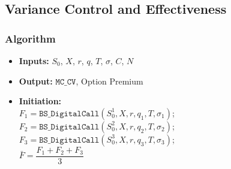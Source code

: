 \subsection{Variance Control and Effectiveness}
\subsubsection{Algorithm}
\begin{itemize}
	\item \textbf{Inputs:} $S_0$, $X$, $r$, $q$, $T$, $\sigma$, $C$, $N$
	\item \textbf{Output:} $\texttt{MC\_CV}$, Option Premium
	\item \textbf{Initiation: }\\ \vspace{1mm}
	$F_1 = \texttt{BS\_DigitalCall}(S_0^1, X, r, q_1, T, \sigma_1)$; \\ \vspace{1mm}
	$F_2 = \texttt{BS\_DigitalCall}(S_0^2, X, r, q_2, T, \sigma_2)$; \\ \vspace{1mm}
	$F_3 = \texttt{BS\_DigitalCall}(S_0^3, X, r, q_3, T, \sigma_3)$; \\ \vspace{1mm}
	$\bar{F} = \dfrac{F_1+F_2+F_3}{3}$
	

\end{itemize}
